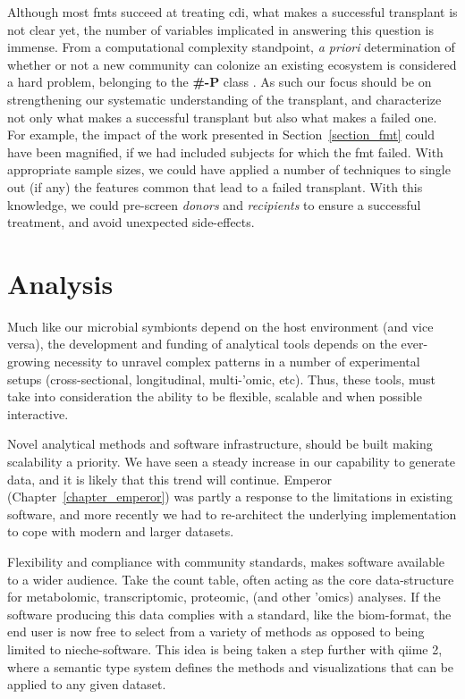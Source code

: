 Although most \glspl{fmt} succeed at treating \gls{cdi}, what makes a
successful transplant is not clear yet, the number of variables implicated in
answering this question is immense. From a computational complexity standpoint,
\textit{a priori} determination of whether or not a new community can colonize 
an existing ecosystem is considered a hard problem, belonging to the 
\textbf{\#-P} class \cite{RN4266}. As such our focus should be on strengthening 
our systematic understanding of the transplant, and characterize not only what 
makes a successful transplant but also what makes a failed one.  For example, 
the impact of the work presented in Section~\ref{section_fmt} could have been 
magnified, if we had included subjects for which the \gls{fmt} failed. With 
appropriate sample sizes, we could have applied a number of techniques to 
single out (if any) the features common that lead to a failed transplant. With 
this knowledge, we could pre-screen \textit{donors} and \textit{recipients} to 
ensure a successful treatment, and avoid unexpected side-effects.

\section{Analysis}

Much like our microbial symbionts depend on the host environment (and vice
versa), the development and funding of analytical tools depends on the
ever-growing necessity to unravel complex patterns in a number of experimental
setups (cross-sectional, longitudinal, multi-'omic, etc). Thus, these tools,
must take into consideration the ability to be flexible, scalable and when
possible interactive.

Novel analytical methods and software infrastructure, should be built making 
scalability a priority.  We have seen a steady increase in our capability to 
generate data, and it is likely that this trend will continue. Emperor 
(Chapter~\ref{chapter_emperor}) was partly a response to the limitations in 
existing software, and more recently we had to re-architect the underlying 
implementation to cope with modern and larger datasets.

Flexibility and compliance with community standards, makes software available
to a wider audience. Take the count table, often acting as the core
data-structure for metabolomic, transcriptomic, proteomic, (and other 'omics)
analyses. If the software producing this data complies with a standard, like
the \gls{biom}-format, the end user is now free to select from a variety of
methods as opposed to being limited to nieche-software. This idea is being
taken a step further with \gls{qiime} 2, where a semantic type system defines
the methods and visualizations that can be applied to any given dataset.


